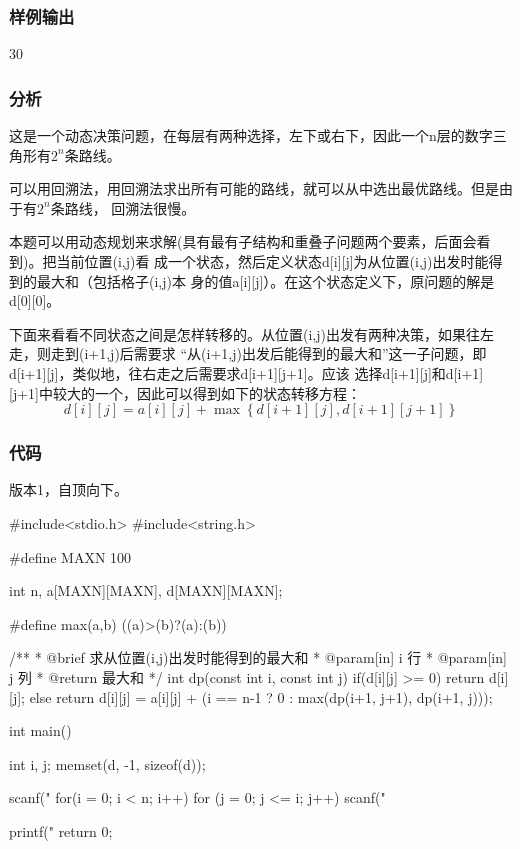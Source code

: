 \subsubsection{样例输出}
\begin{Code}
30
\end{Code}

\subsubsection{分析}
这是一个动态决策问题，在每层有两种选择，左下或右下，因此一个n层的数字三角形有$2^n$条路线。

可以用回溯法，用回溯法求出所有可能的路线，就可以从中选出最优路线。但是由于有$2^n$条路线，
回溯法很慢。

本题可以用动态规划来求解(具有最有子结构和重叠子问题两个要素，后面会看到)。把当前位置(i,j)看
成一个状态，然后定义状态d[i][j]为从位置(i,j)出发时能得到的最大和（包括格子(i,j)本
身的值a[i][j]）。在这个状态定义下，原问题的解是d[0][0]。

下面来看看不同状态之间是怎样转移的。从位置(i,j)出发有两种决策，如果往左走，则走到(i+1,j)后需要求
“从(i+1,j)出发后能得到的最大和”这一子问题，即d[i+1][j]，类似地，往右走之后需要求d[i+1][j+1]。应该
选择d[i+1][j]和d[i+1][j+1]中较大的一个，因此可以得到如下的状态转移方程：
$$d[i][j]=a[i][j]+\max\left\{d[i+1][j], d[i+1][j+1]\right\}$$

\subsubsection{代码}
版本1，自顶向下。

\begin{Codex}[label=numbers_triangle1.c]
#include<stdio.h>
#include<string.h>

#define MAXN 100

int n, a[MAXN][MAXN], d[MAXN][MAXN];

#define max(a,b) ((a)>(b)?(a):(b))

/**
 * @brief 求从位置(i,j)出发时能得到的最大和
 * @param[in] i 行
 * @param[in] j 列
 * @return 最大和
 */
int dp(const int i, const int j) {
    if(d[i][j] >= 0) {
        return d[i][j];
    } else {
        return d[i][j] = a[i][j] + (i == n-1 ? 0 : max(dp(i+1, j+1), dp(i+1, j)));
    }
}

int main() {
    int i, j;
    memset(d, -1, sizeof(d));

    scanf("%
    for(i = 0; i < n; i++)
      for (j = 0; j <= i; j++) scanf("%
    
    printf("%
    return 0;
}
\end{Codex}

